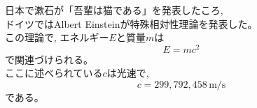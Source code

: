 \documentclass[autodetect-engine,dvipdfmxi-if-dvi,ja=standard]{bxjsarticle}
\begin{document}
日本で漱石が「吾輩は猫である」を発表したころ,\\
ドイツではAlbert Einsteinが特殊相対性理論を発表した。\\

この理論で, エネルギー$E$と質量$m$は
\begin{equation}
  E = mc^{2}
\end{equation}
で関連づけられる。\\
ここに述べられている$c$は光速で,
\begin{equation}
 c = 299{,}792{,}458\,\mathrm{m/s}
\end{equation}
である。
\end{document}
